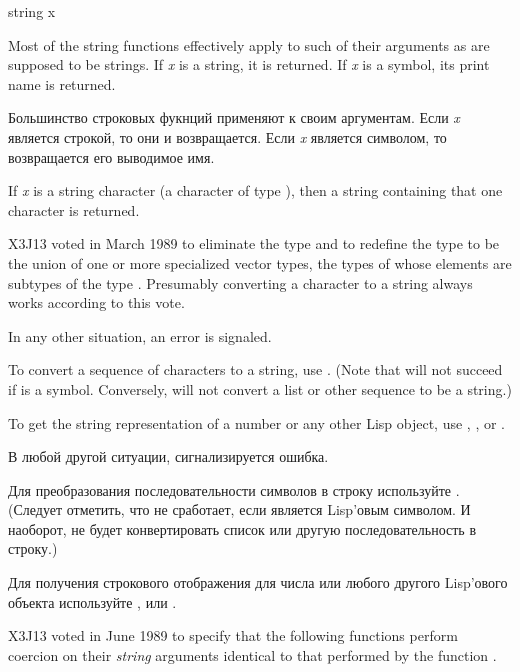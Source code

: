 \begin{defun}[Function]
string x

Most of the string
functions effectively apply 
to such of their arguments as are supposed to be
strings.
If \emph{x} is a string, it is returned.
If \emph{x} is a symbol, its print name is returned.

Большинство строковых фукнций применяют  к своим аргументам.
Если \emph{x} является строкой, то они и возвращается.
Если \emph{x} является символом, то возвращается его выводимое имя.

\begin{obsolete}
If \emph{x} is a string character (a character of type ),
then a string containing that one character is returned.
\end{obsolete}
\begin{newer}
X3J13 voted in March 1989 
to eliminate the type  and to redefine the type
 to be the union of one or more specialized vector
types, the types of whose elements are subtypes of the type .
Presumably converting a character to a string always works according
to this vote.
\end{newer}
In any other situation, an error is signaled.

To convert a sequence of characters to a string, use .
(Note that  will not succeed if  is a symbol.
Conversely,  will not convert a list or other sequence
to be a string.)

To get the string representation of a number or any other Lisp
object, use , ,
or .

В любой другой ситуации, сигнализируется ошибка.

Для преобразования последовательности символов в строку используйте
.
(Следует отметить, что  не сработает, если 
является Lisp'овым символом. И наоборот,  не будет конвертировать
список или другую последовательность в строку.)

Для получения строкового отображения для числа или любого другого Lisp'ового
объекта используйте ,  или
.

\begin{newer}
X3J13 voted in June 1989 
to specify that the following functions perform coercion
on their \emph{string} arguments identical to that performed
by the function .


\end{newer}
\end{defun}

